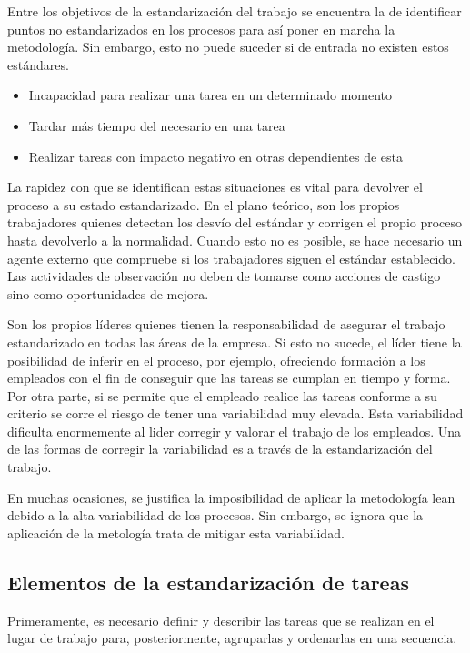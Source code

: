 Entre los objetivos de la estandarización del trabajo se encuentra la de identificar puntos no estandarizados en los procesos para así poner en marcha la metodología. Sin embargo, esto no puede suceder si de entrada no existen estos estándares.

\begin{itemize}
    \item Incapacidad para realizar una tarea en un determinado momento
    \item Tardar más tiempo del necesario en una tarea
    \item Realizar tareas con impacto negativo en otras dependientes de esta
\end{itemize}

La rapidez con que se identifican estas situaciones es vital para devolver el proceso a su estado estandarizado.
En el plano teórico, son los propios trabajadores quienes detectan los desvío del estándar y corrigen el propio proceso hasta devolverlo a la normalidad.
Cuando esto no es posible, se hace necesario un agente externo que compruebe si los trabajadores siguen el estándar establecido.
Las actividades de observación no deben de tomarse como acciones de castigo sino como oportunidades de mejora.

Son los propios líderes quienes tienen la responsabilidad de asegurar el trabajo estandarizado en todas las áreas de la empresa. Si esto no sucede, el líder tiene la posibilidad de inferir en el proceso, por ejemplo, ofreciendo formación a los empleados con el fin de conseguir que las tareas se cumplan en tiempo y forma. Por otra parte, si se permite que el empleado realice las tareas conforme a su criterio se corre el riesgo de tener una variabilidad muy elevada. Esta variabilidad dificulta enormemente al lider corregir y valorar el trabajo de los empleados. Una de las formas de corregir la variabilidad es a través de la estandarización del trabajo.

En muchas ocasiones, se justifica la imposibilidad de aplicar la metodología lean debido a la alta variabilidad de los procesos. Sin embargo, se ignora que la aplicación de la metología trata de mitigar esta variabilidad.

\subsection{Elementos de la estandarización de tareas}

Primeramente, es necesario definir y describir las tareas que se realizan en el lugar de trabajo para, posteriormente, agruparlas y ordenarlas en una secuencia.

